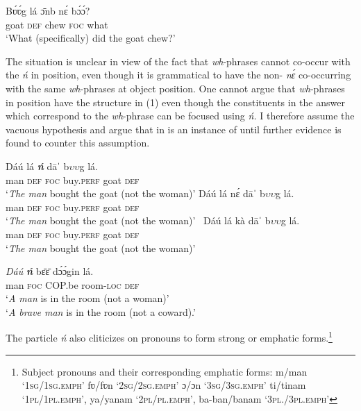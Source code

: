 \documentclass[output=paper,modfonts,nonflat,
\ChapterDOI{10.5281/zenodo.3367154}
 hidelinks
]{langsci/langscibook}
\begin{document}
{    \ea
    \gll B\'{ʋ}\'{ʋ}g  lá   \={ɔ}nb  n\'{ɛ}   b\'{ɔ}\'{ɔ}?    \\
    goat  \textsc{def}  chew  \textsc{foc}  what    \\
    \glt ‘What (specifically) did the goat chew?’      
    \z  
     
    The situation is unclear in view of the fact that \textit{wh}{}-phrases cannot co-occur with the  \textit{ń} in  position, even though it is grammatical to have the non-  \textit{nɛ́} co-occurring with the same \textit{wh}{}-phrases at object position. One cannot argue that \textit{wh}{}-phrases in  position have the structure in (1) even though the constituents in the answer which correspond to the \textit{wh}{}-phrase can be focused using \textit{ń.} I therefore assume the vacuous  hypothesis and argue that   in  is an instance of  until further evidence is found to counter this assumption.
 }  

 
 
\ea\label{ex:abubakari:13}
\ea\label{ex:abubakari:13a}  
\gll Dáú    lá \textbf{\textit{ń}} dāˈ    b$\upsilon \upsilon $g  lá.\\
man  \textsc{def}  \textsc{foc}  buy.\textsc{perf}  goat  \textsc{def}\\
\glt ‘\textit{The man} bought the goat (not the woman)’
\ex\label{ex:abubakari:13b}
\gll *Dáú  lá  nɛ́  dāˈ    b$\upsilon \upsilon $g  lá.\\
man  \textsc{def}  \textsc{foc}  buy.\textsc{perf}  goat  \textsc{def} \\
\glt ‘\textit{The man} bought the goat (not the woman)’
\ex\label{ex:abubakari:13c}\
\gll *Dáú  lá  kà  dāˈ    b$\upsilon \upsilon $g  lá.\\
man  \textsc{def}  \textsc{foc}  buy.\textsc{perf}  goat  \textsc{def}\\
\glt ‘\textit{The man} bought the goat (not the woman)’
\z 
\z
 
\ea\label{ex:abubakari:14} 
\gll \textit{Dáú} \textbf{\textit{ń}} bɛ̄ɛ̄    dɔ́ɔ́gin    lá.\\
man  \textsc{foc}  COP.be    room-\textsc{loc}  \textsc{def}\\
\glt ‘\textit{A man} is in the room (not a woman)’\\
\glt ‘\textit{A brave man} is in the room (not a coward).’
\z 

The particle \textit{ń} also cliticizes on  pronouns to form strong or emphatic forms.\footnote{Subject pronouns and their corresponding emphatic forms: m/man ‘1\textsc{sg}/1\textsc{sg}.\textsc{emph}’ fʋ/fʋn ‘2\textsc{sg}/2\textsc{sg}.\textsc{emph}’ ɔ/ɔn ‘3\textsc{sg}/3\textsc{sg}.\textsc{emph}’ ti/tinam ‘1\textsc{pl}/1\textsc{pl}.\textsc{emph}’, ya/yanam ‘2\textsc{pl}/\textsc{pl}.\textsc{emph}’, ba-ban/banam ‘3\textsc{pl}./3\textsc{pl}.\textsc{emph}’}
\end{document}
